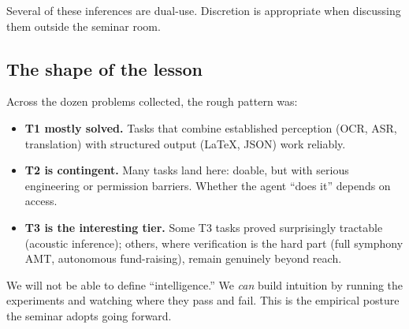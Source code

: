 \begin{remark}[On disclosure]
  Several of these inferences are dual-use.  Discretion
  is appropriate when discussing them outside the seminar
  room.
\end{remark}

\subsection{The shape of the lesson}

\begin{keyresult}
  Across the dozen problems collected, the rough pattern was:
  \begin{itemize}
    \item \textbf{T1 mostly solved.}  Tasks that combine
      established perception (OCR, ASR, translation) with
      structured output (\LaTeX, JSON) work reliably.
    \item \textbf{T2 is contingent.}  Many tasks land here:
      doable, but with serious engineering or permission
      barriers.  Whether the agent ``does it'' depends on
      access.
    \item \textbf{T3 is the interesting tier.}  Some T3 tasks
      proved surprisingly tractable (acoustic inference);
      others, where verification is the hard part (full
      symphony AMT, autonomous fund-raising), remain
      genuinely beyond reach.
  \end{itemize}
\end{keyresult}

\begin{audience}
  We will not be able to define ``intelligence.''  We
  \emph{can} build intuition by running the experiments and
  watching where they pass and fail.  This is the empirical
  posture the seminar adopts going forward.
\end{audience}

